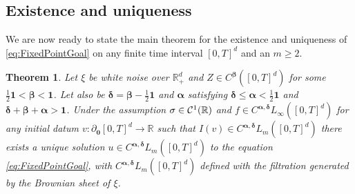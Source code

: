 \documentclass[12pt]{article}
\numberwithin{equation}{section}
\theoremstyle{plain}
\newtheorem{theorem}{Theorem}[section]
\theoremstyle{definition}
\newtheorem{remark}[theorem]{Remark}
\newcommand{\norm}[1]{\left\Vert #1\right\Vert}
\def\bR{\mathbb{R}}\def\bS{\mathbb{S}}
\def\falpha{{\boldsymbol\alpha}}
\def\fbeta{{\boldsymbol\beta}}
\def\fdelta{{\boldsymbol\delta}}
\def\foo{{\boldsymbol 0}}
\def\fone{{\boldsymbol 1}}
\begin{document}
\subsection{Existence and uniqueness}

We are now ready to state the main theorem for the existence and uniqueness of \eqref{eq:FixedPointGoal} on any finite time interval $[0,T]^d$ and an $m\ge 2$. 

\begin{theorem}\label{spde_thm}
    Let $\xi$ be white noise over $\bR^d_+$ and $Z\in C^{\fbeta}([0,T]^d)$ for some $\frac 12\fone <\fbeta <\fone$. Let also be $\fdelta =\fbeta-\frac 12\fone$ and $\falpha$  satisfying $\fdelta\le\falpha<\frac 12\fone$  and $\fdelta+ \fbeta+\falpha>\fone$. Under the assumption $\sigma\in\cC^1(\bR)$ and $f\in C^{\falpha, \fdelta}L_{\infty}([0,T]^d)$  for any initial datum $v\colon \partial_{\foo} [0,T]^d\to \mathbb R$ such that $I(v)\in C^{\falpha, \fdelta}L_{m}([0,T]^d)$ there exists a unique solution $u\in C^{\falpha, \fdelta}L_{m}([0,T]^d)$ to the equation \eqref{eq:FixedPointGoal}, with $ C^{\falpha, \fdelta}L_{m}([0,T]^d) $ defined with the filtration generated by the Brownian sheet  of $\xi$.
\end{theorem}
 
\end{document}
